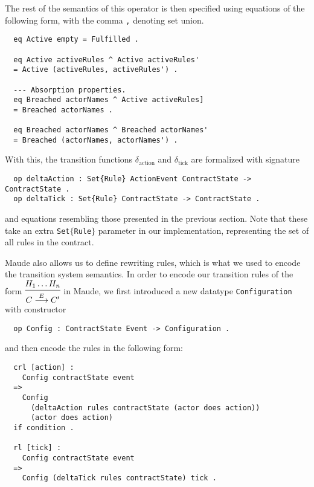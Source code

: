 \documentclass{article}
\begin{document}
The rest of the semantics of this operator is then specified using equations of
the following form, with the comma \texttt{,} denoting set union.
\begin{lstlisting}
  eq Active empty = Fulfilled .

  eq Active activeRules ^ Active activeRules'
  = Active (activeRules, activeRules') .

  --- Absorption properties.
  eq Breached actorNames ^ Active activeRules]
  = Breached actorNames .

  eq Breached actorNames ^ Breached actorNames'
  = Breached (actorNames, actorNames') .
\end{lstlisting}

With this, the transition functions $\delta_\text{action}$ and
$\delta_\text{tick}$ are formalized with signature

\begin{lstlisting}
  op deltaAction : Set{Rule} ActionEvent ContractState -> ContractState .
  op deltaTick : Set{Rule} ContractState -> ContractState .
\end{lstlisting}

and equations resembling those presented in the previous section.
Note that these take an extra \texttt{Set$\{$Rule$\}$} parameter in our implementation,
representing the set of all rules in the contract.

Maude also allows us to define rewriting rules, which is what we used to encode
the transition system semantics.
In order to encode our transition rules of the form
$\begin{prooftree}
  \hypo{H_1 \dots H_n}
  \infer1{C \overset{E}{\longrightarrow} C'} \end{prooftree}$
in Maude, we first introduced a new datatype
\texttt{Configuration} with constructor

\begin{lstlisting}
  op Config : ContractState Event -> Configuration .
\end{lstlisting}

and then encode the rules in the following form:
\begin{lstlisting}
  crl [action] :
    Config contractState event
  =>
    Config
      (deltaAction rules contractState (actor does action))
      (actor does action)
  if condition .

  rl [tick] :
    Config contractState event
  =>
    Config (deltaTick rules contractState) tick .
\end{lstlisting}
\end{document}
